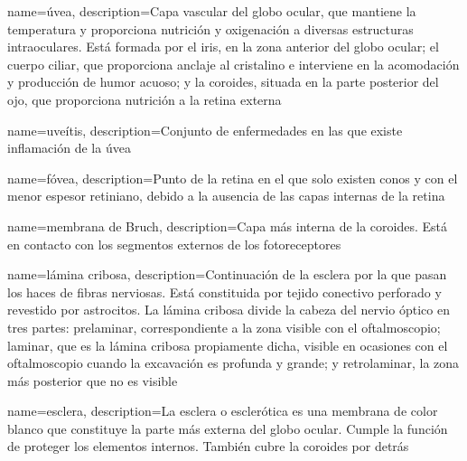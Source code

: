 {
  name={úvea},
  description={Capa vascular del globo ocular, que mantiene la
    temperatura y proporciona nutrición y oxigenación a diversas
    estructuras intraoculares. Está formada por el iris, en la zona
    anterior del globo ocular; el cuerpo ciliar, que proporciona
    anclaje al cristalino e interviene en la acomodación y producción
    de humor acuoso; y la coroides, situada en la parte posterior del
    ojo, que proporciona nutrición a la retina externa}
}

{
  name={uveítis},
  description={Conjunto de enfermedades en las que existe inflamación de la úvea}
}

{
  name={fóvea},
  description={Punto de la retina en el que solo existen conos y con
    el menor espesor retiniano, debido a la ausencia de las capas
    internas de la retina}
}

{
  name={membrana de Bruch},
  description={Capa más interna de la coroides. Está en contacto con los
    segmentos externos de los fotoreceptores}
}

{
  name={lámina cribosa},
  description={Continuación de la esclera por la que pasan los haces
    de fibras nerviosas. Está constituida por tejido conectivo
    perforado y revestido por astrocitos. La lámina cribosa divide la
    cabeza del nervio óptico en tres partes: prelaminar,
    correspondiente a la zona visible con el oftalmoscopio; laminar,
    que es la lámina cribosa propiamente dicha, visible en ocasiones con
    el oftalmoscopio cuando la excavación es profunda y grande; y
    retrolaminar, la zona más posterior que no es visible}
}

{
  name={esclera},
  description={La esclera o esclerótica es una membrana de
    color blanco que constituye la parte más externa del globo ocular.
    Cumple la función de proteger los elementos internos. También
    cubre la coroides por detrás}
}